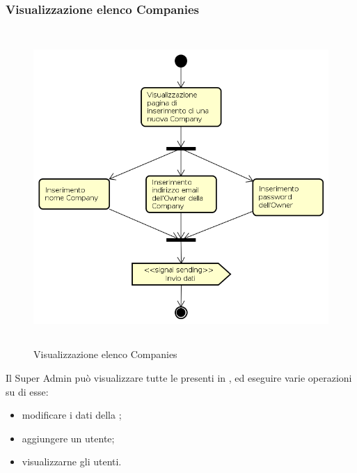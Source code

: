 \subsubsection{Visualizzazione elenco Companies}
\begin{figure}[H]
\begin{center}
\includegraphics[height=12cm]{res/sections/backend/activities/creazioneCompanySA.png}
\caption{Visualizzazione elenco Companies}
\end{center}
\end{figure}
Il Super Admin può visualizzare tutte le  presenti in , ed eseguire varie operazioni su di esse:
\begin{itemize}
\item modificare i dati della ;
\item aggiungere un utente;
\item visualizzarne gli utenti.
\end{itemize}
\newpage

